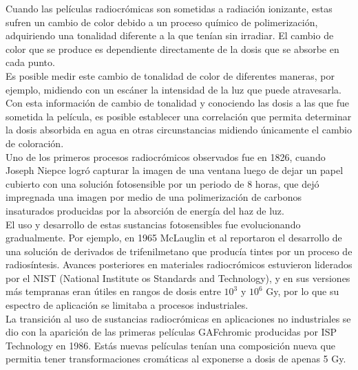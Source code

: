 Cuando las películas radiocrómicas son sometidas a radiación ionizante, estas sufren un cambio de color debido a un proceso químico de polimerización, adquiriendo una tonalidad diferente a la que tenían sin irradiar. El cambio de color que se produce es dependiente directamente de la dosis que se absorbe en cada punto. \\

Es posible medir este cambio de tonalidad de color de diferentes maneras, por ejemplo, midiendo con un escáner la intensidad de la luz que puede atravesarla. Con esta información de cambio de tonalidad y conociendo las dosis a las que fue sometida la película, es posible establecer una correlación que permita determinar la dosis absorbida en agua en otras circunstancias midiendo únicamente el cambio de coloración. \\

Uno de los primeros procesos radiocrómicos observados fue en 1826, cuando Joseph Niepce logró capturar la imagen de una ventana luego de dejar un papel cubierto con una solución fotosensible por un periodo de 8 horas, que dejó impregnada una imagen por medio de una polimerización de carbonos insaturados producidas por la absorción de energía del haz de luz.\\

El uso y desarrollo de estas sustancias fotosensibles fue evolucionando gradualmente. Por ejemplo, en 1965 McLauglin et al \cite{McLaughlin1965} reportaron el desarrollo de una solución de derivados de trifenilmetano que producía tintes por un proceso de radiosíntesis. Avances posteriores en materiales radiocrómicos estuvieron liderados por el NIST (National Institute os Standards and Technology), y en sus versiones más tempranas eran útiles en rangos de dosis entre $10^3$ y $10^6$ Gy, por lo que su espectro de aplicación se limitaba a procesos industriales\cite{Williams2011}.\\

La transición al uso de sustancias radiocrómicas en aplicaciones no industriales se dio con la aparición de las primeras películas GAFchromic producidas por ISP Technology en 1986. Estás nuevas películas tenían una composición nueva que permitia tener transformaciones cromáticas al exponerse a dosis de apenas 5 Gy\cite{Williams2011}.\\


